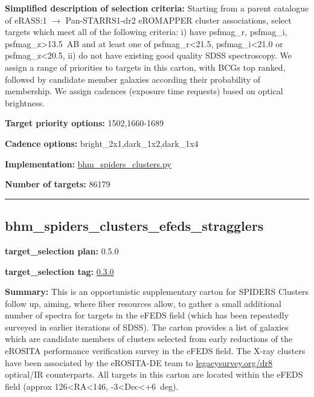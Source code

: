 \noindent\textbf{Simplified description of selection criteria:} Starting from a
parent catalogue of eRASS:1 $\rightarrow$ Pan-STARRS1-dr2 eROMAPPER cluster
associations, select targets which meet all of the following criteria:
i) have psfmag\_r, psfmag\_i, psfmag\_z\textgreater13.5~AB and at least
one of psfmag\_r\textless21.5, psfmag\_i\textless21.0 or
psfmag\_z\textless20.5, ii) do not have existing good quality SDSS
spectroscopy. We assign a range of priorities to targets in this carton,
with BCGs top ranked, followed by candidate member galaxies according
their probability of membership. We assign cadences (exposure time
requests) based on optical brightness.


\noindent\textbf{Target priority options:} 1502,1660-1689

\noindent\textbf{Cadence options:} bright\_2x1,dark\_1x2,dark\_1x4

\noindent\textbf{Implementation:}
\href{https://github.com/sdss/target_selection/blob/0.3.0/python/target_selection/cartons/bhm_spiders_clusters.py}{bhm\_spiders\_clusters.py}

\noindent\textbf{Number of targets:} 86179

\begin{center}\rule{0.5\linewidth}{0.5pt}\end{center}

\hypertarget{bhm_spiders_clusters_efeds_stragglers_plan0.5.0}{%
\subsection{bhm\_spiders\_clusters\_efeds\_stragglers}\label{bhm_spiders_clusters_efeds_stragglers_plan0.5.0}}

\noindent\textbf{target\_selection plan:} 0.5.0

\noindent\textbf{target\_selection tag:}
\href{https://github.com/sdss/target_selection/tree/0.3.0/}{0.3.0}

\noindent\textbf{Summary:} This is an opportunistic supplementary carton for
SPIDERS Clusters follow up, aiming, where fiber resources allow, to
gather a small additional number of spectra for targets in the eFEDS
field (which has been repeatedly surveyed in earlier iterations of
SDSS). The carton provides a list of galaxies which are candidate
members of clusters selected from early reductions of the eROSITA
performance verification survey in the eFEDS field. The X-ray clusters
have been associated by the eROSITA-DE team to
\href{https://www.legacysurvey.org/dr8/}{legacysurvey.org/dr8}
optical/IR counterparts. All targets in this carton are located within
the eFEDS field (approx 126\textless RA\textless146,
-3\textless Dec\textless+6~deg).

